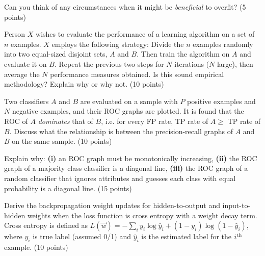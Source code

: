 \documentclass[fleqn]{homework}
\begin{document}
  \maketitle

  \begin{problem}{1}
    \begin{question}
      Can you think of any circumstances when it might be \textit{beneficial} to
      overfit? (5 points)
    \end{question}
  \end{problem}

  \begin{problem}{2}
    \begin{question}
      Person $X$ wishes to evaluate the performance of a learning algorithm on a
      set of $n$ examples.  $X$ employs the following strategy: Divide the $n$
      examples randomly into two equal-sized disjoint sets, $A$ and $B$.  Then
      train the algorithm on $A$ and evaluate it on $B$.  Repeat the previous
      two steps for $N$ iterations ($N$ large), then average the $N$ performance
      measures obtained.  Is this sound empirical methodology?  Explain why or
      why not. (10 points)
    \end{question}
  \end{problem}

  \begin{problem}{3}
    \begin{question}
      Two classifiers $A$ and $B$ are evaluated on a sample with $P$ positive
      examples and $N$ negative examples, and their ROC graphs are plotted.  It
      is found that the ROC of $A$ \textit{dominates} that of $B$, i.e. for
      every FP rate, TP rate of $A \ge$ TP rate of $B$.  Discuss what the
      relationship is between the precision-recall graphs of $A$ and $B$ on the
      same sample. (10 points)
    \end{question}
  \end{problem}

  \begin{problem}{4}
    \begin{question}
      Explain why: \textbf{(i)} an ROC graph must be monotonically increasing,
      \textbf{(ii)} the ROC graph of a majority class classifier is a diagonal
      line, \textbf{(iii)} the ROC graph of a random classifier that ignores
      attributes and guesses each class with equal probability is a diagonal
      line. (15 points)
    \end{question}
  \end{problem}

  \begin{problem}{5}
    \begin{question}
      Derive the backpropagation weight updates for hidden-to-output and
      input-to-hidden weights when the loss function is cross entropy with a
      weight decay term.  Cross entropy is defined as
      $L(\vec{w}) = -\sum_i y_i \log \hat{y}_i + (1-y_i)\log(1-\hat{y}_i)$,
      where $y_i$ is true label (assumed 0/1) and $\hat{y}_i$ is the estimated
      label for the $i\textsuperscript{th}$ example. (10 points)
    \end{question}
  \end{problem}
\end{document}
